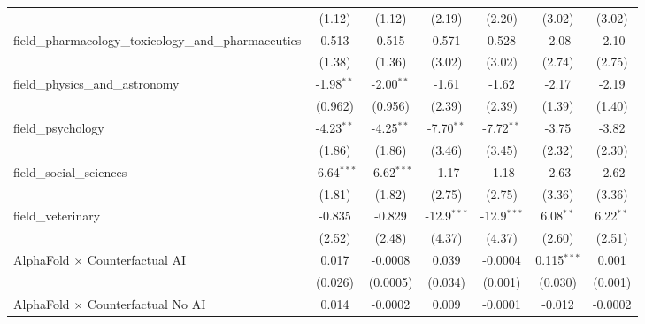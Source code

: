 \begin{tabular}{lcccccc}
                                                               & (1.12)        & (1.12)        & (2.19)        & (2.20)        & (3.02)        & (3.02)\\   
   field\_pharmacology\_toxicology\_and\_pharmaceutics         & 0.513         & 0.515         & 0.571         & 0.528         & -2.08         & -2.10\\   
                                                               & (1.38)        & (1.36)        & (3.02)        & (3.02)        & (2.74)        & (2.75)\\   
   field\_physics\_and\_astronomy                              & -1.98$^{**}$  & -2.00$^{**}$  & -1.61         & -1.62         & -2.17         & -2.19\\   
                                                               & (0.962)       & (0.956)       & (2.39)        & (2.39)        & (1.39)        & (1.40)\\   
   field\_psychology                                           & -4.23$^{**}$  & -4.25$^{**}$  & -7.70$^{**}$  & -7.72$^{**}$  & -3.75         & -3.82\\   
                                                               & (1.86)        & (1.86)        & (3.46)        & (3.45)        & (2.32)        & (2.30)\\   
   field\_social\_sciences                                     & -6.64$^{***}$ & -6.62$^{***}$ & -1.17         & -1.18         & -2.63         & -2.62\\   
                                                               & (1.81)        & (1.82)        & (2.75)        & (2.75)        & (3.36)        & (3.36)\\   
   field\_veterinary                                           & -0.835        & -0.829        & -12.9$^{***}$ & -12.9$^{***}$ & 6.08$^{**}$   & 6.22$^{**}$\\   
                                                               & (2.52)        & (2.48)        & (4.37)        & (4.37)        & (2.60)        & (2.51)\\   
   AlphaFold $\times$ Counterfactual AI                        & 0.017         & -0.0008       & 0.039         & -0.0004       & 0.115$^{***}$ & 0.001\\   
                                                               & (0.026)       & (0.0005)      & (0.034)       & (0.001)       & (0.030)       & (0.001)\\   
   AlphaFold $\times$ Counterfactual No AI                     & 0.014         & -0.0002       & 0.009         & -0.0001       & -0.012        & -0.0002\\   

\end{tabular}
